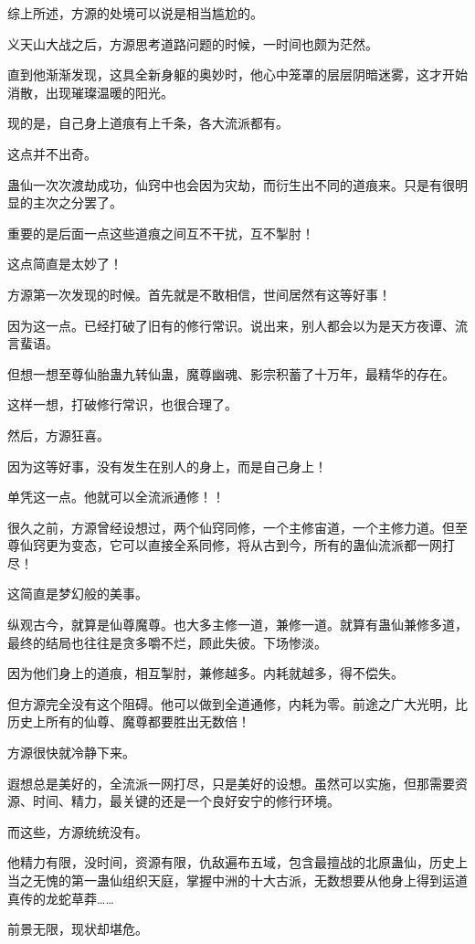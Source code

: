 \begin{this_body}
综上所述，方源的处境可以说是相当尴尬的。

义天山大战之后，方源思考道路问题的时候，一时间也颇为茫然。

直到他渐渐发现，这具全新身躯的奥妙时，他心中笼罩的层层阴暗迷雾，这才开始消散，出现璀璨温暖的阳光。

现的是，自己身上道痕有上千条，各大流派都有。

这点并不出奇。

蛊仙一次次渡劫成功，仙窍中也会因为灾劫，而衍生出不同的道痕来。只是有很明显的主次之分罢了。

重要的是后面一点这些道痕之间互不干扰，互不掣肘！

这点简直是太妙了！

方源第一次发现的时候。首先就是不敢相信，世间居然有这等好事！

因为这一点。已经打破了旧有的修行常识。说出来，别人都会以为是天方夜谭、流言蜚语。

但想一想至尊仙胎蛊九转仙蛊，魔尊幽魂、影宗积蓄了十万年，最精华的存在。

这样一想，打破修行常识，也很合理了。

然后，方源狂喜。

因为这等好事，没有发生在别人的身上，而是自己身上！

单凭这一点。他就可以全流派通修！！

很久之前，方源曾经设想过，两个仙窍同修，一个主修宙道，一个主修力道。但至尊仙窍更为变态，它可以直接全系同修，将从古到今，所有的蛊仙流派都一网打尽！

这简直是梦幻般的美事。

纵观古今，就算是仙尊魔尊。也大多主修一道，兼修一道。就算有蛊仙兼修多道，最终的结局也往往是贪多嚼不烂，顾此失彼。下场惨淡。

因为他们身上的道痕，相互掣肘，兼修越多。内耗就越多，得不偿失。

但方源完全没有这个阻碍。他可以做到全道通修，内耗为零。前途之广大光明，比历史上所有的仙尊、魔尊都要胜出无数倍！

方源很快就冷静下来。

遐想总是美好的，全流派一网打尽，只是美好的设想。虽然可以实施，但那需要资源、时间、精力，最关键的还是一个良好安宁的修行环境。

而这些，方源统统没有。

他精力有限，没时间，资源有限，仇敌遍布五域，包含最擅战的北原蛊仙，历史上当之无愧的第一蛊仙组织天庭，掌握中洲的十大古派，无数想要从他身上得到运道真传的龙蛇草莽……

前景无限，现状却堪危。


\end{this_body}
